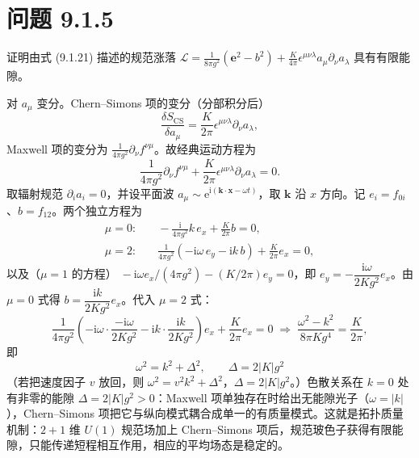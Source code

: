 \section*{问题 9.1.5}
\begin{problem}
证明由式 (9.1.21) 描述的规范涨落
$\mathcal{L}=\frac{1}{8\pi g^2}(\mathbf{e}^2-b^2)+\frac{K}{4\pi}\epsilon^{\mu\nu\lambda}a_{\mu}\partial_{\nu}a_{\lambda}$
具有有限能隙。
\end{problem}
\solution
对 $a_{\mu}$ 变分。Chern--Simons 项的变分（分部积分后）
\begin{equation*}
\frac{\delta S_{\text{CS}}}{\delta a_{\mu}}=\frac{K}{2\pi}\epsilon^{\mu\nu\lambda}\partial_{\nu}a_{\lambda} ,
\end{equation*}
Maxwell 项的变分为 $\frac{1}{4\pi g^{2}}\partial_{\nu}f^{\nu\mu}$。故经典运动方程为
\begin{equation*}
\frac{1}{4\pi g^{2}}\partial_{\nu}f^{\nu\mu}+\frac{K}{2\pi}\epsilon^{\mu\nu\lambda}\partial_{\nu}a_{\lambda}=0 .
\end{equation*}
取辐射规范 $\partial_ia_i=0$，并设平面波 $a_\mu\sim\mathrm{e}^{\mathrm{i}(\pmb{k}\cdot\pmb{x}-\omega t)}$，取 $\pmb{k}$ 沿 $x$ 方向。记 $e_i=f_{0i}$、$b=f_{12}$。两个独立方程为
\begin{align*}
\mu=0:&\quad -\frac{\mathrm{i}}{4\pi g^{2}}k\,e_x+\frac{K}{2\pi}b=0 ,\\
\mu=2:&\quad \frac{1}{4\pi g^{2}}(-\mathrm{i}\omega\,e_y-\mathrm{i}k\,b)+\frac{K}{2\pi}e_x=0 ,
\end{align*}
以及（$\mu=1$ 的方程）$\;-\mathrm{i}\omega e_x/(4\pi g^{2})-(K/2\pi)e_y=0$，即 $e_y=-\dfrac{\mathrm{i}\omega}{2Kg^{2}}e_x$。由 $\mu=0$ 式得 $b=\dfrac{\mathrm{i}k}{2Kg^{2}}e_x$。代入 $\mu=2$ 式：
\begin{equation*}
\frac{1}{4\pi g^{2}}\left(-\mathrm{i}\omega\cdot\frac{-\mathrm{i}\omega}{2Kg^{2}}-\mathrm{i}k\cdot\frac{\mathrm{i}k}{2Kg^{2}}\right)e_x+\frac{K}{2\pi}e_x=0
\;\Longrightarrow\;
\frac{\omega^{2}-k^{2}}{8\pi K g^{4}}=\frac{K}{2\pi} ,
\end{equation*}
即
\begin{equation*}
\boxed{\;\omega^{2}=k^{2}+\Delta^{2},\qquad \Delta=2|K|g^{2}\;}
\end{equation*}
（若把速度因子 $v$ 放回，则 $\omega^2=v^2k^2+\Delta^2$，$\Delta=2|K|g^2$。）色散关系在 $k=0$ 处有非零的能隙 $\Delta=2|K|g^{2}>0$：Maxwell 项单独存在时给出无能隙光子（$\omega=|k|$），Chern--Simons 项把它与纵向模式耦合成单一的有质量模式。这就是拓扑质量机制：$2+1$ 维 $U(1)$ 规范场加上 Chern--Simons 项后，规范玻色子获得有限能隙，只能传递短程相互作用，相应的平均场态是稳定的。

